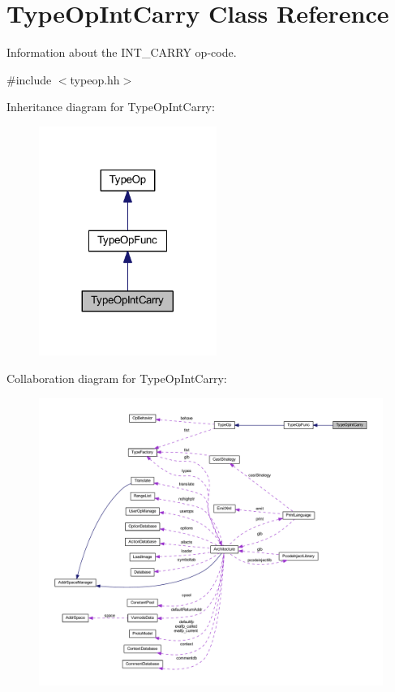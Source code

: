 \hypertarget{class_type_op_int_carry}{}\section{Type\+Op\+Int\+Carry Class Reference}
\label{class_type_op_int_carry}


Information about the I\+N\+T\+\_\+\+C\+A\+R\+RY op-\/code.  




{\ttfamily \#include $<$typeop.\+hh$>$}



Inheritance diagram for Type\+Op\+Int\+Carry\+:
\nopagebreak
\begin{figure}[H]
\begin{center}
\leavevmode
\includegraphics[width=164pt]{class_type_op_int_carry__inherit__graph}
\end{center}
\end{figure}


Collaboration diagram for Type\+Op\+Int\+Carry\+:
\nopagebreak
\begin{figure}[H]
\begin{center}
\leavevmode
\includegraphics[width=350pt]{class_type_op_int_carry__coll__graph}
\end{center}
\end{figure}
